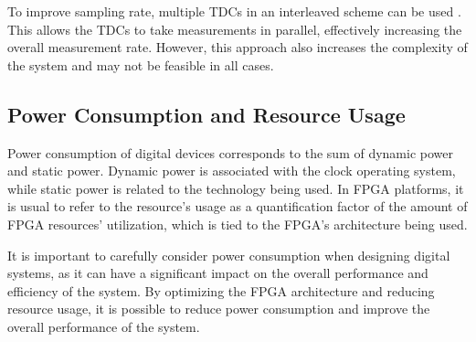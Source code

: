 To improve sampling rate, multiple \gls{TDC}s in an interleaved scheme can be used \citep{physics}. This allows the \glspl{TDC} to take measurements in parallel, effectively increasing the overall measurement rate. However, this approach also increases the complexity of the system and may not be feasible in all cases.


\subsection{Power Consumption and Resource Usage} %
\label{sub:power_consumption_and_resource_usage}

Power consumption of digital devices corresponds to the sum of dynamic power and static power. Dynamic power is associated with the clock operating system, while static power is related to the technology being used. In \gls{FPGA} platforms, it is usual to refer to the resource’s usage as a quantification factor of the amount of \gls{FPGA} resources’ utilization, which is tied to the \gls{FPGA}’s architecture being used.

It is important to carefully consider power consumption when designing digital systems, as it can have a significant impact on the overall performance and efficiency of the system. By optimizing the \gls{FPGA} architecture and reducing resource usage, it is possible to reduce power consumption and improve the overall performance of the system.

